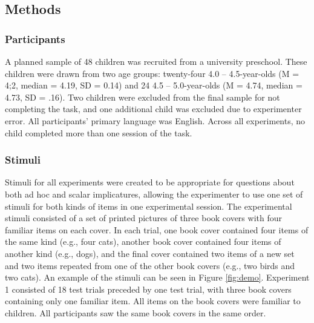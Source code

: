 \documentclass[man]{apa2}
\begin{document}

\subsection{Methods}

\subsubsection{Participants} A planned sample of 48 children was recruited from a university preschool. These children were drawn from two age groups: twenty-four 4.0 -- 4.5-year-olds (M = 4;2, median = 4.19, SD = 0.14) and 24 4.5 -- 5.0-year-olds (M = 4.74, median = 4.73, SD = .16). Two children were excluded from the final sample for not completing the task, and one additional child was excluded due to experimenter error. All participants' primary language was English. Across all experiments, no child completed more than one session of the task.  

\subsubsection{Stimuli}
Stimuli for all experiments were created to be appropriate for questions about both ad hoc and scalar implicatures, allowing the experimenter to use one set of stimuli for both kinds of items in one experimental session. The experimental stimuli consisted of a set of printed pictures of three book covers with four familiar items on each cover. In each trial, one book cover contained four items of the same kind (e.g., four cats), another book cover contained four items of another kind (e.g., dogs), and the final cover contained two items of a new set and two items repeated from one of the other book covers (e.g., two birds and two cats). An example of the stimuli can be seen in Figure \ref{fig:demo}. Experiment 1 consisted of 18 test trials preceded by one test trial, with three book covers containing only one familiar item. All items on the book covers were familiar to children. All participants saw the same book covers in the same order. 
\end{document}
